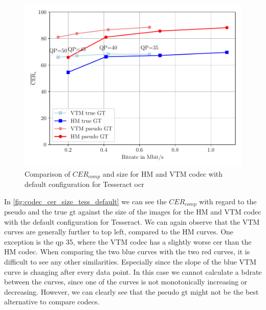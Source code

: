 \begin{figure}[h]
    \centering
    \includegraphics[width=\textwidth]{../images/analyze/codec_cer_size_tess_default.pdf}
    \caption{Comparison of $CER_{comp}$ and size for HM and VTM codec with default configuration for Tesseract \gls{ocr}}
    \label{fig:codec_cer_size_tess_default}
\end{figure}

In \autoref{fig:codec_cer_size_tess_default} we can see the $CER_{comp}$ with regard to the pseudo and the true \gls{gt} against the size of the images for the HM and VTM codec with the default configuration for Tesseract.
We can again observe that the VTM curves are generally further to top left, compared to the HM curves.
One exception is the \gls{qp} 35, where the VTM codec has a slightly worse \gls{cer} than the HM codec.
When comparing the two blue curves with the two red curves, it is difficult to see any other similarities.
Especially since the slope of the blue VTM curve is changing after every data point.
In this case we cannot calculate a \gls{bdrate} between the curves, since one of the curves is not monotonically increasing or decreasing.
However, we can clearly see that the pseudo \gls{gt} might not be the best alternative to compare codecs.


